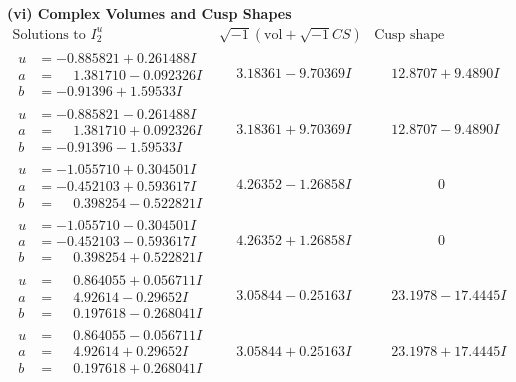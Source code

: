 \documentclass[1p]{elsarticle_modified}
\theoremstyle{definition}
\newcommand{\I}{\sqrt{-1}}
\begin{document}
\newpage\flushleft \textbf{(vi) Complex Volumes and Cusp Shapes}
$$\begin{array}{c|c|c}  
\text{Solutions to }I^u_{2}& \I (\text{vol} + \sqrt{-1}CS) & \text{Cusp shape}\\
 \hline 
\begin{aligned}
u &= -0.885821 + 0.261488 I \\
a &= \phantom{-}1.381710 - 0.092326 I \\
b &= -0.91396 + 1.59533 I\end{aligned}
 & \phantom{-}3.18361 - 9.70369 I & \phantom{-}12.8707 + 9.4890 I \\ \hline\begin{aligned}
u &= -0.885821 - 0.261488 I \\
a &= \phantom{-}1.381710 + 0.092326 I \\
b &= -0.91396 - 1.59533 I\end{aligned}
 & \phantom{-}3.18361 + 9.70369 I & \phantom{-}12.8707 - 9.4890 I \\ \hline\begin{aligned}
u &= -1.055710 + 0.304501 I \\
a &= -0.452103 + 0.593617 I \\
b &= \phantom{-}0.398254 - 0.522821 I\end{aligned}
 & \phantom{-}4.26352 - 1.26858 I & \phantom{-0.000000 } 0 \\ \hline\begin{aligned}
u &= -1.055710 - 0.304501 I \\
a &= -0.452103 - 0.593617 I \\
b &= \phantom{-}0.398254 + 0.522821 I\end{aligned}
 & \phantom{-}4.26352 + 1.26858 I & \phantom{-0.000000 } 0 \\ \hline\begin{aligned}
u &= \phantom{-}0.864055 + 0.056711 I \\
a &= \phantom{-}4.92614 - 0.29652 I \\
b &= \phantom{-}0.197618 - 0.268041 I\end{aligned}
 & \phantom{-}3.05844 - 0.25163 I & \phantom{-}23.1978 - 17.4445 I \\ \hline\begin{aligned}
u &= \phantom{-}0.864055 - 0.056711 I \\
a &= \phantom{-}4.92614 + 0.29652 I \\
b &= \phantom{-}0.197618 + 0.268041 I\end{aligned}
 & \phantom{-}3.05844 + 0.25163 I & \phantom{-}23.1978 + 17.4445 I \\ \hline\begin{aligned}

\end{aligned}
\end{array}$$
\end{document}
